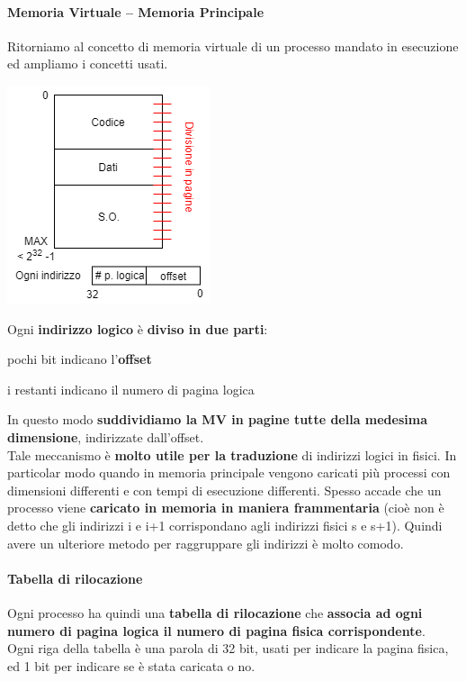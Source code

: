 \documentclass[10pt]{report}
\begin{document}
\paragraph{Memoria Virtuale -- Memoria Principale} Ritorniamo al concetto di memoria virtuale di un processo mandato in esecuzione ed ampliamo i concetti usati.
\begin{multicols}{2}
\begin{center}
\includegraphics[scale=1]{paging.png}
\end{center}
Ogni \textbf{indirizzo logico} è \textbf{diviso in due parti}:
\begin{list}{}{}
	\item pochi bit indicano l'\textbf{offset}
	\item i restanti indicano il numero di pagina logica
\end{list}
In questo modo \textbf{suddividiamo la MV in pagine tutte della medesima dimensione}, indirizzate dall'offset.\\
Tale meccanismo è \textbf{molto utile per la traduzione} di indirizzi logici in fisici. In particolar modo quando in memoria principale vengono caricati più processi con dimensioni differenti e con tempi di esecuzione differenti. Spesso accade che un processo viene \textbf{caricato in memoria in maniera frammentaria} (cioè non è detto che gli indirizzi i e i+1 corrispondano agli indirizzi fisici s e s+1). Quindi avere un ulteriore metodo per raggruppare gli indirizzi è molto comodo.
\end{multicols}
\paragraph{Tabella di rilocazione} Ogni processo ha quindi una \textbf{tabella di rilocazione} che \textbf{associa ad ogni numero di pagina logica il numero di pagina fisica corrispondente}.\\
Ogni riga della tabella è una parola di 32 bit, usati per indicare la pagina fisica, ed 1 bit per indicare se è stata caricata o no.
\end{document}
